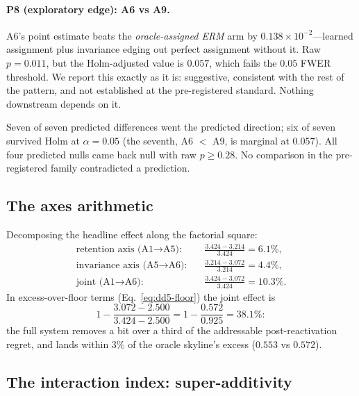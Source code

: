 \paragraph{P8 (exploratory edge): A6 vs A9.}
A6's point estimate beats the \emph{oracle-assigned ERM} arm by
$0.138\times 10^{-2}$---learned assignment plus invariance edging out
perfect assignment without it. Raw $p = 0.011$, but the Holm-adjusted value
is $0.057$, which fails the $0.05$ FWER threshold. We report this exactly
as it is: suggestive, consistent with the rest of the pattern, and not
established at the pre-registered standard. Nothing downstream depends on
it.

\begin{keypoint}
Seven of seven predicted differences went the predicted direction; six of
seven survived Holm at $\alpha=0.05$ (the seventh, A6 $<$ A9, is marginal
at $0.057$). All four predicted nulls came back null with raw
$p \ge 0.28$. No comparison in the pre-registered family contradicted a
prediction.
\end{keypoint}

\subsection{The axes arithmetic}
\label{sec:dd5-e1-axes}

Decomposing the headline effect along the factorial square:
\begin{align}
\text{retention axis (A1} \to \text{A5):}\quad
& \frac{3.424 - 3.214}{3.424} = 6.1\%, \label{eq:dd5-axis-ret}\\[2pt]
\text{invariance axis (A5} \to \text{A6):}\quad
& \frac{3.214 - 3.072}{3.214} = 4.4\%, \label{eq:dd5-axis-inv}\\[2pt]
\text{joint (A1} \to \text{A6):}\quad
& \frac{3.424 - 3.072}{3.424} = 10.3\%. \label{eq:dd5-axis-joint}
\end{align}
In excess-over-floor terms (Eq.~\eqref{eq:dd5-floor}) the joint effect is
\begin{equation}
1 - \frac{3.072 - 2.500}{3.424 - 2.500}
= 1 - \frac{0.572}{0.925} = 38.1\%:
\label{eq:dd5-excess}
\end{equation}
the full system removes a bit over a third of the addressable
post-reactivation regret, and lands within $3\%$ of the oracle skyline's
excess ($0.553$ vs $0.572$).

\subsection{The interaction index: super-additivity}
\label{sec:dd5-e1-interaction}

